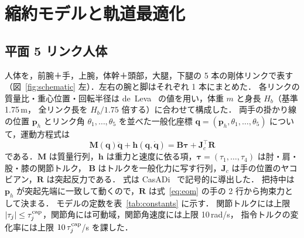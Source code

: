 \section{縮約モデルと軌道最適化}
\label{sec:model}
\label{sec:opt}
\subsection{平面 5 リンク人体}
人体を，前腕＋手，上腕，体幹＋頭部，大腿，下腿の 5 本の剛体リンクで表す（図~\ref{fig:schematic} 左）．左右の腕と脚はそれぞれ 1 本にまとめた．
各リンクの質量比・重心位置・回転半径は de~Leva~\cite{deleva1996} の値を用い，体重 $m$ と身長 $H_b$（基準 1.75\,m，
全リンク長を $H_b/1.75$ 倍する）に合わせて構成した．
両手の掛かり線の位置 $\bm p_h$ とリンク角 $\theta_1,\dots,\theta_5$ を並べた一般化座標 $\bm q=(\bm p_h,\theta_1,\dots,\theta_5)$ について，運動方程式は
\begin{equation}
\bm M(\bm q)\ddot{\bm q}+\bm h(\bm q,\dot{\bm q})=\bm B\bm\tau+\bm J_c^\top\bm R
\label{eq:eom}
\end{equation}
である．$\bm M$ は質量行列，$\bm h$ は重力と速度に依る項，$\bm\tau=(\tau_1,\dots,\tau_4)$ は肘・肩・股・膝の関節トルク，
$\bm B$ はトルクを一般化力に写す行列，$\bm J_c$ は手の位置のヤコビアン，$\bm R$ は突起反力である．
式は CasADi~\cite{andersson2019} で記号的に導出した．
把持中は $\bm p_h$ が突起先端に一致して動くので，$\bm R$ は式~\eqref{eq:eom} の手の 2 行から拘束力として決まる．
モデルの定数を表~\ref{tab:constants} に示す．
関節トルクには上限 $|\tau_j|\le\tau^{\mathrm{cap}}_j$，関節角には可動域，関節角速度には上限 10\,rad/s，
指令トルクの変化率には上限 $10\,\tau^{\mathrm{cap}}_j$/s を課した．
